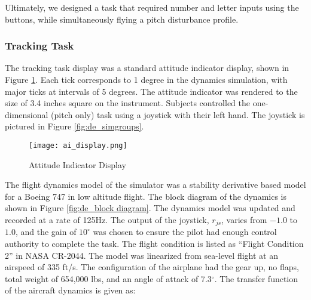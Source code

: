 Ultimately, we designed a task that required number and letter inputs using the buttons, while simultaneously flying a pitch disturbance profile.

\subsubsection{Tracking Task}

The tracking task display was a standard attitude indicator display, shown in Figure \ref{fig:de_ai_display}.
Each tick corresponds to 1 degree in the dynamics simulation, with major ticks at intervals of 5 degrees.
The attitude indicator was rendered to the size of 3.4 inches square on the instrument.
Subjects controlled the one-dimensional (pitch only) task using a joystick with their left hand.
The joystick is pictured in Figure \ref{fig:de_simgroups}.

\begin{figure}
    \texttt{[image: ai\_display.png]}
    \caption{Attitude Indicator Display}
    \label{fig:de_ai_display}
\end{figure}

The flight dynamics model of the simulator was a stability derivative based model for a Boeing 747 in low altitude flight.
The block diagram of the dynamics is shown in Figure \ref{fig:de_block diagram}.
The dynamics model was updated and recorded at a rate of 125Hz.
The output of the joystick, $r_{js}$, varies from $-1.0$ to $1.0$, and the gain of $10^{\circ}$ was chosen to ensure the pilot had enough control authority to complete the task.
The flight condition is listed as ``Flight Condition 2'' in NASA CR-2044\cite{NASACR}.
The model was linearized from sea-level flight at an airspeed of 335 ft/s.
The configuration of the airplane had the gear up, no flaps, total weight of 654,000 lbs, and an angle of attack of 7.3$^{\circ}$.
The transfer function of the aircraft dynamics is given as:

